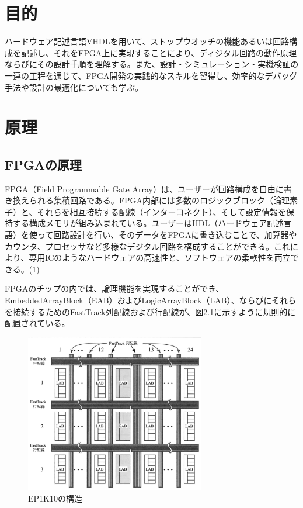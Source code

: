 \documentclass{jlreq}
\numberwithin{equation}{section}
\begin{document}
\section{目的}
ハードウェア記述言語VHDLを用いて、ストップウオッチの機能あるいは回路構成を記述し、それをFPGA上に実現することにより、ディジタル回路の動作原理ならびにその設計手順を理解する。また、設計・シミュレーション・実機検証の一連の工程を通じて、FPGA開発の実践的なスキルを習得し、効率的なデバッグ手法や設計の最適化についても学ぶ。

\section{原理}
\subsection{FPGAの原理}
FPGA（Field Programmable Gate Array）は、ユーザーが回路構成を自由に書き換えられる集積回路である。FPGA内部には多数のロジックブロック（論理素子）と、それらを相互接続する配線（インターコネクト）、そして設定情報を保持する構成メモリが組み込まれている。ユーザーはHDL（ハードウェア記述言語）を使って回路設計を行い、そのデータをFPGAに書き込むことで、加算器やカウンタ、プロセッサなど多様なデジタル回路を構成することができる。これにより、専用ICのようなハードウェアの高速性と、ソフトウェアの柔軟性を両立できる。(1)

FPGAのチップの内では、論理機能を実現することができ、EmbeddedArrayBlock（EAB）およびLogicArrayBlock（LAB）、ならびにそれらを接続するためのFastTrack列配線および行配線が、図2.1に示すように規則的に配置されている。

\begin{figure}[H]
  \centering
  \includegraphics[width=0.7\textwidth]{assets/EP1K10_stracture.png}
  \caption{EP1K10の構造}
\end{figure}
\end{document}
